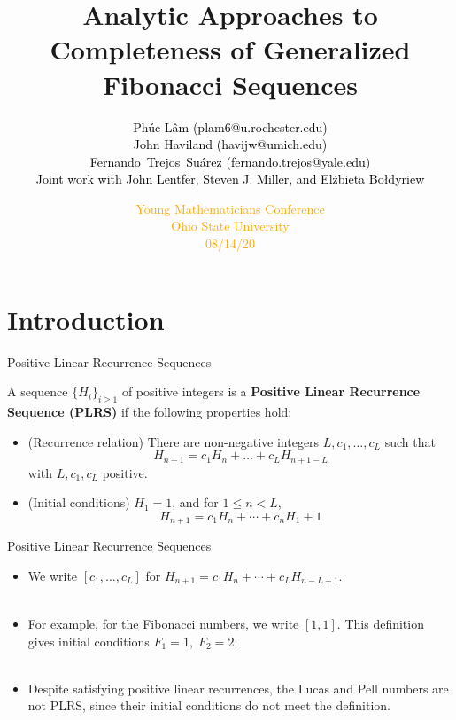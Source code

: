 \documentclass{beamer}
\title[PLRS]
{
  Analytic Approaches to Completeness of Generalized Fibonacci Sequences
}
\author[Steven J Miller] %
{\textcolor{black}{ Ph\'uc L\^am (plam6@u.rochester.edu) \\ John Haviland (havijw@umich.edu) \\Fernando\ Trejos\ Su\'arez (fernando.trejos@yale.edu) \\[0.1in] Joint work with John Lentfer, Steven J. Miller, and El\.zbieta Bo\l dyriew }}
\date[2020]
{\small{\textcolor{orange}{Young Mathematicians Conference\\
Ohio State University\\
08/14/20}}
}
\begin{document}
\begin{frame}
  \titlepage
\end{frame}

\large


\section{Introduction}

\begin{frame}{
Positive Linear Recurrence Sequences}
    \begin{definition}
        A sequence $\{H_i\}_{i \ge 1}$ of positive integers is a {\bf Positive Linear Recurrence Sequence (PLRS)} if the following properties hold: 
        \begin{itemize}
            \pause
            \item (Recurrence relation) There are non-negative integers $L, c_1, \dots, c_L$ such that \vspace{-0.1in}
                \[ 
                    H_{n+1} = c_1H_n + \dots + c_LH_{n+1-L}
                \]
            with $L, c_1, c_L$ positive.
            \pause
            \item (Initial conditions) $H_1 = 1$, and for $1 \le n < L$, \vspace{-0.1in}
                \[
                    H_{n+1} = c_1H_n + \cdots + c_nH_1 + 1
                \]
        \end{itemize}
    \end{definition}
\end{frame}

\begin{frame}{ 
    Positive Linear Recurrence Sequences}
    \begin{itemize}
        \item We write $[c_1, \ldots ,c_L]$ for $H_{n+1} = c_1 H_n + \cdots + c_L H_{n-L+1}$.\\ \
        \pause
        \item For example, for the Fibonacci numbers, we write $[1,1]$. This definition gives initial conditions $F_1=1,\; F_2=2$.\\ \
        \pause
        \item Despite satisfying positive linear recurrences, the Lucas and Pell numbers are not PLRS, since their initial conditions do not meet the definition.
    \end{itemize}
\end{frame}
\end{document}
